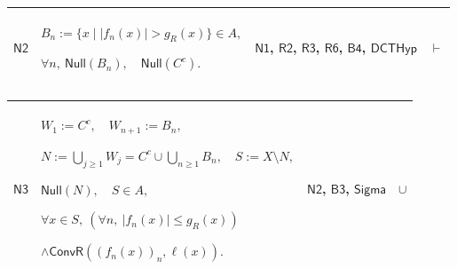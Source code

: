 \documentclass[11pt]{amsart}
\newlength{\FTCFourColumnBody}
\begin{document}
{\begin{tabular}
\end{tabular}%
\par\setlength{\parskip}{0pt}\nointerlineskip
\noindent
\begin{tabular}{|@{}>{\centering\arraybackslash}m{0.078431\FTCFourColumnBody}|>{\centering\arraybackslash}m{0.535947\FTCFourColumnBody}|>{\centering\arraybackslash}m{0.281045\FTCFourColumnBody}|>{\centering\arraybackslash}m{0.104575\FTCFourColumnBody}|}\hline
\hypertarget{dct:N2}{$\displaystyle \textsf{N2}$} & $\displaystyle B_n:=\{x\mid |f_n(x)|>g_R(x)\}\in A,$\par
$\displaystyle \forall n,\ \textsf{Null}(B_n),\quad\textsf{Null}(C^c).$ & \hyperlink{dct:N1}{$\displaystyle \textsf{N1}$}, \hyperlink{dct:R2}{$\displaystyle \textsf{R2}$}, \hyperlink{dct:R3}{$\displaystyle \textsf{R3}$}, \hyperlink{dct:R6}{$\displaystyle \textsf{R6}$}, \hyperlink{dct:B4}{$\displaystyle \textsf{B4}$}, \hyperlink{dctdef:DCTHyp}{$\displaystyle \textsf{DCTHyp}$} & $\displaystyle \vdash$\\ \hline
\end{tabular}%
\par\setlength{\parskip}{0pt}\nointerlineskip
\noindent
\begin{tabular}{|@{}>{\centering\arraybackslash}m{0.078431\FTCFourColumnBody}|>{\centering\arraybackslash}m{0.535947\FTCFourColumnBody}|>{\centering\arraybackslash}m{0.281045\FTCFourColumnBody}|>{\centering\arraybackslash}m{0.104575\FTCFourColumnBody}|}\hline
\hypertarget{dct:N3}{$\displaystyle \textsf{N3}$} & $\displaystyle W_1:=C^c,\quad W_{n+1}:=B_n,$\par
$\displaystyle N:=\bigcup_{j\ge1}W_j=C^c\cup\bigcup_{n\ge1}B_n,\quad S:=X\setminus N,$\par
$\displaystyle \textsf{Null}(N),\quad S\in A,$\par
$\displaystyle \forall x\in S,\ (\forall n,\ |f_n(x)|\le g_R(x))$\par
$\displaystyle \land\textsf{ConvR}((f_n(x))_n,\ell(x)).$ & \hyperlink{dct:N2}{$\displaystyle \textsf{N2}$}, \hyperlink{dct:B3}{$\displaystyle \textsf{B3}$}, \hyperlink{ax:Sigma}{$\displaystyle \textsf{Sigma}$} & $\displaystyle \cup$\\ \hline
\end{tabular}%
\par\setlength{\parskip}{0pt}\nointerlineskip
\noindent
\begin{tabular}{|@{}>{\centering\arraybackslash}m{0.078431\FTCFourColumnBody}|>{\centering\arraybackslash}m{0.535947\FTCFourColumnBody}|>{\centering\arraybackslash}m{0.281045\FTCFourColumnBody}|>{\centering\arraybackslash}m{0.104575\FTCFourColumnBody}|}\hline

\end{tabular}}
\end{document}

